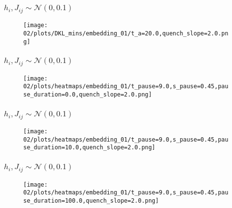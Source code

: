 \documentclass{beamer}
\begin{document}
\begin{frame}
    \frametitle{\( h_i, J_{ij} \sim \mathcal{N}(0, 0.1) \)}
    \begin{figure}
        \texttt{[image: 02/plots/DKL\_mins/embedding\_01/t\_a=20.0,quench\_slope=2.0.png]}
    \end{figure}
\end{frame}
\begin{frame}
    \frametitle{\( h_i, J_{ij} \sim \mathcal{N}(0, 0.1) \)}
    \begin{figure}
        \texttt{[image: 02/plots/heatmaps/embedding\_01/t\_pause=9.0,s\_pause=0.45,pause\_duration=0.0,quench\_slope=2.0.png]}
    \end{figure}
\end{frame}
\begin{frame}
    \frametitle{\( h_i, J_{ij} \sim \mathcal{N}(0, 0.1) \)}
    \begin{figure}
        \texttt{[image: 02/plots/heatmaps/embedding\_01/t\_pause=9.0,s\_pause=0.45,pause\_duration=10.0,quench\_slope=2.0.png]}
    \end{figure}
\end{frame}
\begin{frame}
    \frametitle{\( h_i, J_{ij} \sim \mathcal{N}(0, 0.1) \)}
    \begin{figure}
        \texttt{[image: 02/plots/heatmaps/embedding\_01/t\_pause=9.0,s\_pause=0.45,pause\_duration=100.0,quench\_slope=2.0.png]}
    \end{figure}
\end{frame}
\end{document}
